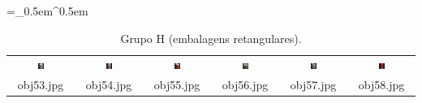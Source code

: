 \begin{table}[H]
  \centering
  \caption{Grupo H (embalagens retangulares).}
  \tabulinesep =_0.5em^0.5em
  \everyrow{\tabucline[0.4pt]-}
  \begin{tabu}{|cccccc|}
    \includegraphics[width=0.1\textwidth,height=0.1\textwidth]{imagens/coil_100/embalagens_retangulares/obj9__30.png} &
    \includegraphics[width=0.1\textwidth,height=0.1\textwidth]{imagens/coil_100/embalagens_retangulares/obj22__0.png} &
    \includegraphics[width=0.1\textwidth,height=0.1\textwidth]{imagens/coil_100/embalagens_retangulares/obj39__55.png} &
    \includegraphics[width=0.1\textwidth,height=0.1\textwidth]{imagens/coil_100/embalagens_retangulares/obj55__0.png} &
    \includegraphics[width=0.1\textwidth,height=0.1\textwidth]{imagens/coil_100/embalagens_retangulares/obj65__50.png} &
    \includegraphics[width=0.1\textwidth,height=0.1\textwidth]{imagens/coil_100/embalagens_retangulares/obj90__0.png}
    \\
    \scriptsize{obj53.jpg} & \scriptsize{obj54.jpg} & \scriptsize{obj55.jpg} &
    \scriptsize{obj56.jpg} & \scriptsize{obj57.jpg} & \scriptsize{obj58.jpg}
  \end{tabu}
\end{table}

